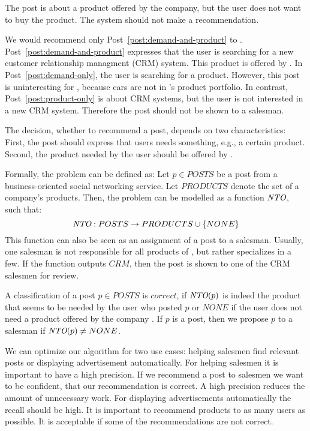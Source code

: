 \begin{post}
	\centering
	\caption{The post is about a product offered by the company, but the user does not want to buy the product. The system should not make a recommendation.}
	\label{post:product-only}
\end{post}

We would recommend only Post~\ref{post:demand-and-product} to \acme.
Post~\ref{post:demand-and-product} expresses that the user is searching for a new customer relationship managment (CRM) system.
This product is offered by \acme.
In Post~\ref{post:demand-only}, the user is searching for a product.
However, this post is uninteresting for \acme, because cars are not in \acme's product portfolio.
In contrast, Post~\ref{post:product-only} is about CRM systems, but the user is not interested in a new CRM system.
Therefore the post should not be shown to a salesman.

The decision, whether to recommend a post, depends on two characteristics:
First, the post should express that users needs something, e.g., a certain product.
Second, the product needed by the user should be offered by \acme.

Formally, the problem can be defined as:
Let $p \in POSTS$ be a post from a business-oriented social networking service.
Let $PRODUCTS$ denote the set of a company's products.
Then, the problem can be modelled as a function $\emph{NTO}$, such that:
\begin{displaymath}
	\emph{NTO}: POSTS \to PRODUCTS \cup \{NONE\}
\end{displaymath}
This function can also be seen as an assignment of a post to a salesman.
Usually, one salesman is not responsible for all products of \acme, but rather specializes in a few.
If the \nto function outputs $CRM$, then the post is shown to one of the CRM salesmen for review.

A classification of a post $p \in POSTS$ is $correct$, if $\emph{NTO}(p)$ is indeed the product that seems to be needed by the user who posted $p$ or $NONE$ if the user does not need a product offered by the company \acme.
If $p$ is a post, then we propose $p$ to a salesman if $\emph{NTO}(p) \neq NONE$.

We can optimize our algorithm for two use cases: helping salesmen find relevant posts or displaying advertisement automatically.
For helping salesmen it is important to have a high precision.
If we recommend a post to salesmen we want to be confident, that our recommendation is correct.
A high precision reduces the amount of unnecessary work.
For displaying advertisements automatically the recall should be high.
It is important to recommend products to as many users as possible.
It is acceptable if some of the recommendations are not correct.

